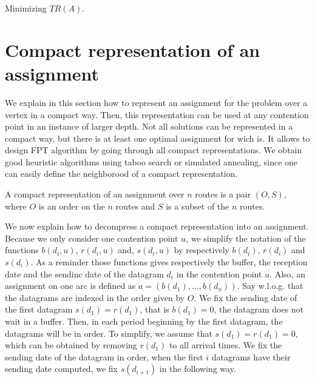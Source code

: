 \documentclass[english]{article}
\begin{document}
       Minimizing $TR(A)$.
    
     
    
\section{Compact representation of an assignment}





We explain in this section how to represent an assignment for the problem 
\spall over a vertex in a compact way. Then, this representation
can be used at any contention point in an instance of larger depth.
Not all solutions can be represented in a compact way, but there
is at least one optimal assignment for \spall wich is.
It allows to design FPT algorithm by going through all compact 
representations. We obtain good heuristic algorithms using taboo search or simulated annealing, since one can easily define the neighborood of a compact representation.\\



\begin{definition}
A compact representation of an assignment over $n$ routes is a pair $(O,S)$,
where $O$ is an order on the $n$ routes and $S$ is a subset of the $n$ routes.
\end{definition}

We now explain how to decompress a compact representation into an assignment.
Because we only consider one contention point $u$, we simplify the notation of the functions $b(d_i,u)$, $r(d_i,u)$ and, $s(d_i,u)$ by respectively $b(d_i)$, $r(d_i)$ and $s(d_i)$.
As a reminder those functions gives respectively the buffer, the reception date and the sendinc date of the datagram $d_i$ in the contention point $u$. Also, an assignment on one arc is defined as $a = (b(d_1),\dots,b(d_n))$.
Say w.l.o.g. that the datagrams are indexed in the order given by $O$.
We fix the sending date of the first datagram $s(d_1) = r(d_1)$, that is $b(d_1) = 0$, the datagram does not wait in a buffer. Then, in each period beginning by the first datagram, the datagrams will be in order. To simplify, we assume that $s(d_1) = r(d_1) = 0$, which can be obtained by removing $r(d_1)$ to all arrival times. We fix the sending date of the datagram in order, when the first $i$ datagrams have their sending date computed, we fix $s(d_{i+1})$ in the following way. 
\end{document}
